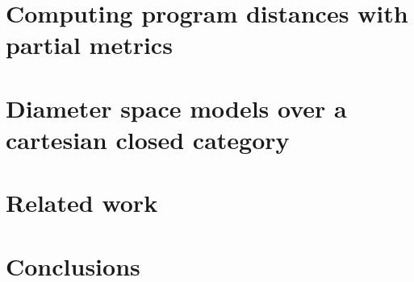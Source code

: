 \documentclass[a4paper,UKenglish,cleveref, autoref, english, thm-restate]{lipics-v2019}
\begin{document}


\section{Computing program distances with partial metrics}



\section{Diameter space models over a cartesian closed category}



\section{Related work}



\section{Conclusions}





%
%
%
%
%
%
%
\end{document}
